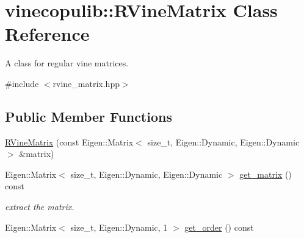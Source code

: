 \hypertarget{classvinecopulib_1_1_r_vine_matrix}{}\section{vinecopulib\+:\+:R\+Vine\+Matrix Class Reference}
\label{classvinecopulib_1_1_r_vine_matrix}


A class for regular vine matrices.  




{\ttfamily \#include $<$rvine\+\_\+matrix.\+hpp$>$}

\subsection*{Public Member Functions}
\begin{DoxyCompactItemize}
\item 
\hyperlink{classvinecopulib_1_1_r_vine_matrix_a4aaaa0d65dc215fe086b02ca6240dccc}{R\+Vine\+Matrix} (const Eigen\+::\+Matrix$<$ size\+\_\+t, Eigen\+::\+Dynamic, Eigen\+::\+Dynamic $>$ \&matrix)
\item 
Eigen\+::\+Matrix$<$ size\+\_\+t, Eigen\+::\+Dynamic, Eigen\+::\+Dynamic $>$ \hyperlink{classvinecopulib_1_1_r_vine_matrix_a37c79233fca1e56e1535cbb37f8d3177}{get\+\_\+matrix} () const \hypertarget{classvinecopulib_1_1_r_vine_matrix_a37c79233fca1e56e1535cbb37f8d3177}{}\label{classvinecopulib_1_1_r_vine_matrix_a37c79233fca1e56e1535cbb37f8d3177}

\begin{DoxyCompactList}\small\item\em extract the matrix. \end{DoxyCompactList}\item 
Eigen\+::\+Matrix$<$ size\+\_\+t, Eigen\+::\+Dynamic, 1 $>$ \hyperlink{classvinecopulib_1_1_r_vine_matrix_a71554c734c3cbb4c066c1f17fe94a284}{get\+\_\+order} () const \hypertarget{classvinecopulib_1_1_r_vine_matrix_a71554c734c3cbb4c066c1f17fe94a284}{}\label{classvinecopulib_1_1_r_vine_matrix_a71554c734c3cbb4c066c1f17fe94a284}


\end{DoxyCompactItemize}
